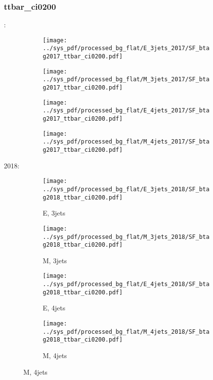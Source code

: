 \documentclass{beamer}
\begin{document}
\begin{frame}
\frametitle{ttbar_ci0200}
\fontsize{5}{1}:
\begin{figure}
\centering
\begin{subfigure}[b]{0.24\textwidth}
\texttt{[image: ../sys\_pdf/processed\_bg\_flat/E\_3jets\_2017/SF\_btag2017\_ttbar\_ci0200.pdf]}
\end{subfigure}
\begin{subfigure}[b]{0.24\textwidth}
\texttt{[image: ../sys\_pdf/processed\_bg\_flat/M\_3jets\_2017/SF\_btag2017\_ttbar\_ci0200.pdf]}
\end{subfigure}
\begin{subfigure}[b]{0.24\textwidth}
\texttt{[image: ../sys\_pdf/processed\_bg\_flat/E\_4jets\_2017/SF\_btag2017\_ttbar\_ci0200.pdf]}
\end{subfigure}
\begin{subfigure}[b]{0.24\textwidth}
\texttt{[image: ../sys\_pdf/processed\_bg\_flat/M\_4jets\_2017/SF\_btag2017\_ttbar\_ci0200.pdf]}
\end{subfigure}
\end{figure}
2018:
\begin{figure}
\centering
\begin{subfigure}[b]{0.24\textwidth}
\texttt{[image: ../sys\_pdf/processed\_bg\_flat/E\_3jets\_2018/SF\_btag2018\_ttbar\_ci0200.pdf]}
\captionsetup{font=tiny}
\caption{E, 3jets}
\end{subfigure}
\begin{subfigure}[b]{0.24\textwidth}
\texttt{[image: ../sys\_pdf/processed\_bg\_flat/M\_3jets\_2018/SF\_btag2018\_ttbar\_ci0200.pdf]}
\captionsetup{font=tiny}
\caption{M, 3jets}
\end{subfigure}
\begin{subfigure}[b]{0.24\textwidth}
\texttt{[image: ../sys\_pdf/processed\_bg\_flat/E\_4jets\_2018/SF\_btag2018\_ttbar\_ci0200.pdf]}
\captionsetup{font=tiny}
\caption{E, 4jets}
\end{subfigure}
\begin{subfigure}[b]{0.24\textwidth}
\texttt{[image: ../sys\_pdf/processed\_bg\_flat/M\_4jets\_2018/SF\_btag2018\_ttbar\_ci0200.pdf]}
\captionsetup{font=tiny}
\caption{M, 4jets}
\end{subfigure}
\end{figure}
\end{frame}
\end{document}
